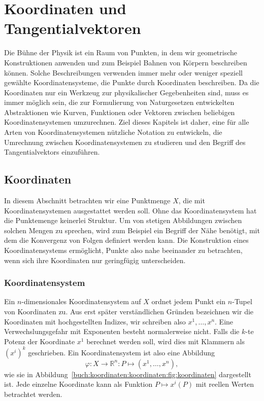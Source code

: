 %
%
%
\chapter{Koordinaten und Tangentialvektoren
\label{chapter:koordinaten}}
Die Bühne der Physik ist ein Raum von Punkten, in dem wir geometrische
Konstruktionen anwenden und zum Beispiel Bahnen von Körpern beschreiben
können.
Solche Beschreibungen verwenden immer mehr oder weniger speziell gewählte
Koordinatensysteme, die Punkte durch Koordinaten beschreiben.
Da die Koordinaten nur ein Werkzeug zur physikalischer Gegebenheiten
sind, muss es immer möglich sein, die zur Formulierung von Naturgesetzen
entwickelten Abstraktionen wie Kurven, Funktionen oder Vektoren zwischen
beliebigen Koordinatensystemen umzurechnen.
Ziel dieses Kapitels ist daher, eine für alle Arten von Koordinatensystemen
nützliche Notation zu entwickeln, die Umrechnung zwischen Koordinatensystemen
zu studieren und den Begriff des Tangentialvektors einzuführen.

%
%
\section{Koordinaten
\label{buch:koordinaten:section:koordinaten}}
In diesem Abschnitt betrachten wir eine Punktmenge $X$, die mit
Koordinatensystemen ausgestattet werden soll.
Ohne das Koordinatensystem hat die Punktemenge keinerlei Struktur.
Um von stetigen Abbildungen zwischen solchen Mengen zu sprechen,
wird zum Beispiel ein Begriff der Nähe benötigt, mit dem die Konvergenz
von Folgen definiert werden kann.
Die Konstruktion eines Koordinatensystems ermöglicht, Punkte also
nahe beeinander zu betrachten, wenn sich ihre Koordinaten nur geringfügig
unterscheiden.

%
%
\subsection{Koordinatensystem}
%
Ein $n$-dimensionales Koordinatensystem auf $X$ ordnet jedem Punkt 
ein $n$-Tupel von Koordinaten zu.
Aus erst später verständlichen Gründen bezeichnen wir die Koordinaten
mit hochgestellten Indizes, wir schreiben also $x^1,\dots,x^n$.
Eine Verwechslungsgefahr mit Exponenten besteht normalerweise nicht.
Falls die $k$-te Potenz der Koordinate $x^1$ berechnet werden soll, 
wird dies mit Klammern als $(x^i)^k$ geschrieben.
Ein Koordinatensystem ist also eine Abbildung
\[
\varphi
\colon
X\to \mathbb{R}^n
:
P \mapsto (x^1,\dots,x^n),
\]
wie sie in Abbildung~\ref{buch:koordinaten:koordinaten:fig:koordinaten}
dargestellt ist.
Jede einzelne Koordinate kann als Funktion $P\mapsto x^i(P)$ mit
reellen Werten betrachtet werden.

